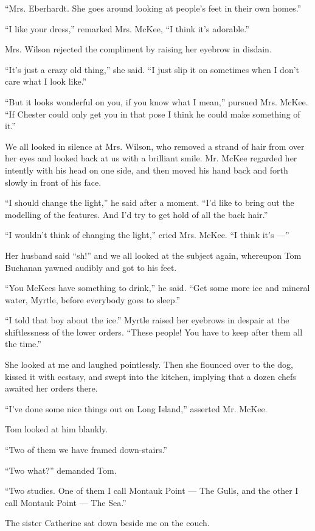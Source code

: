 \documentclass{znotebook}
\begin{document}
``Mrs. Eberhardt. She goes around looking at people's feet in their own homes.''

``I like your dress,'' remarked Mrs. McKee, ``I think it's adorable.''

Mrs. Wilson rejected the compliment by raising her eyebrow in disdain.

``It's just a crazy old thing,'' she said. ``I just slip it on sometimes when I don't care what I look like.''

``But it looks wonderful on you, if you know what I mean,'' pursued Mrs. McKee. ``If Chester could only get you in that pose I think he could make something of it.''

We all looked in silence at Mrs. Wilson, who removed a strand of hair from over her eyes and looked back at us with a brilliant smile. Mr. McKee regarded her intently with his head on one side, and then moved his hand back and forth slowly in front of his face.

``I should change the light,'' he said after a moment. ``I'd like to bring out the modelling of the features. And I'd try to get hold of all the back hair.''

``I wouldn't think of changing the light,'' cried Mrs. McKee. ``I think it's ---''

Her husband said ``sh!'' and we all looked at the subject again, whereupon Tom Buchanan yawned audibly and got to his feet.

``You McKees have something to drink,'' he said. ``Get some more ice and mineral water, Myrtle, before everybody goes to sleep.''

``I told that boy about the ice.'' Myrtle raised her eyebrows in despair at the shiftlessness of the lower orders. ``These people! You have to keep after them all the time.''

She looked at me and laughed pointlessly. Then she flounced over to the dog, kissed it with ecstasy, and swept into the kitchen, implying that a dozen chefs awaited her orders there.

``I've done some nice things out on Long Island,'' asserted Mr. McKee.

Tom looked at him blankly.

``Two of them we have framed down-stairs.''

``Two what?'' demanded Tom.

``Two studies. One of them I call Montauk Point ---{} The Gulls, and the other I call Montauk Point ---{} The Sea.''

The sister Catherine sat down beside me on the couch.
\end{document}
